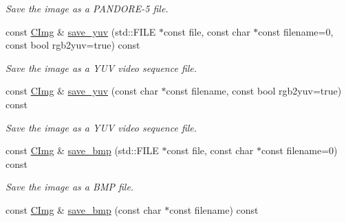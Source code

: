 \begin{DoxyCompactItemize}
\begin{DoxyCompactList}\small\item\em Save the image as a PANDORE-\/5 file. \item\end{DoxyCompactList}\item 
\hypertarget{structcimg__library_1_1_c_img_a90f48e7931d33b70a970ba4a93b02c62}{
const \hyperlink{structcimg__library_1_1_c_img}{CImg} \& \hyperlink{structcimg__library_1_1_c_img_a90f48e7931d33b70a970ba4a93b02c62}{save\_\-yuv} (std::FILE $\ast$const file, const char $\ast$const filename=0, const bool rgb2yuv=true) const }
\label{structcimg__library_1_1_c_img_a90f48e7931d33b70a970ba4a93b02c62}

\begin{DoxyCompactList}\small\item\em Save the image as a YUV video sequence file. \item\end{DoxyCompactList}\item 
\hypertarget{structcimg__library_1_1_c_img_aa14c3969f237c6f899b06a3818dc187a}{
const \hyperlink{structcimg__library_1_1_c_img}{CImg} \& \hyperlink{structcimg__library_1_1_c_img_aa14c3969f237c6f899b06a3818dc187a}{save\_\-yuv} (const char $\ast$const filename, const bool rgb2yuv=true) const }
\label{structcimg__library_1_1_c_img_aa14c3969f237c6f899b06a3818dc187a}

\begin{DoxyCompactList}\small\item\em Save the image as a YUV video sequence file. \item\end{DoxyCompactList}\item 
\hypertarget{structcimg__library_1_1_c_img_a505479a53dd6ee630d0c8c8a2bd24357}{
const \hyperlink{structcimg__library_1_1_c_img}{CImg} \& \hyperlink{structcimg__library_1_1_c_img_a505479a53dd6ee630d0c8c8a2bd24357}{save\_\-bmp} (std::FILE $\ast$const file, const char $\ast$const filename=0) const }
\label{structcimg__library_1_1_c_img_a505479a53dd6ee630d0c8c8a2bd24357}

\begin{DoxyCompactList}\small\item\em Save the image as a BMP file. \item\end{DoxyCompactList}\item 
\hypertarget{structcimg__library_1_1_c_img_ad995c489d16a78cbdf6f7f5e9e042c67}{
const \hyperlink{structcimg__library_1_1_c_img}{CImg} \& \hyperlink{structcimg__library_1_1_c_img_ad995c489d16a78cbdf6f7f5e9e042c67}{save\_\-bmp} (const char $\ast$const filename) const }
\label{structcimg__library_1_1_c_img_ad995c489d16a78cbdf6f7f5e9e042c67}


\end{DoxyCompactItemize}
